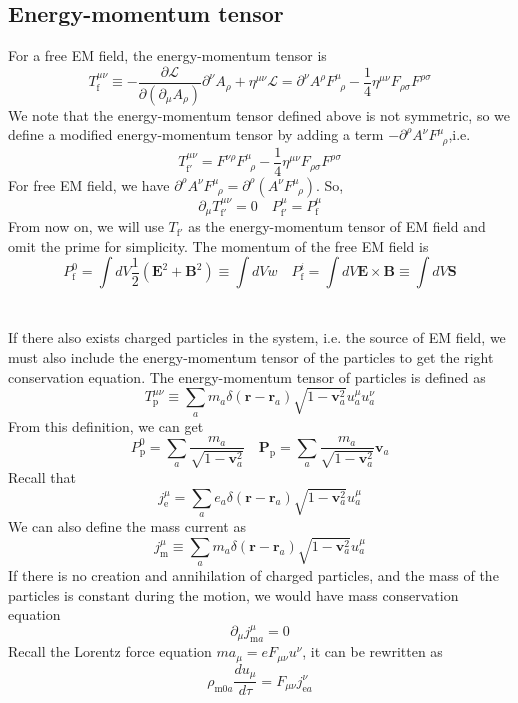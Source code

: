 \subsection{Energy-momentum tensor}
For a free EM field, the energy-momentum tensor is
\[T_{\mathrm{f}}^{\mu \nu} \equiv -\frac{\partial \mathcal{L}}{\partial(\partial_{\mu}A_{\rho})} \partial^{\nu} A_{\rho} + \eta^{\mu \nu} \mathcal{L} = \partial^{\nu}A^{\rho} F^{\mu}_{\phantom{\rho}\rho}-\frac{1}{4}\eta^{\mu\nu}F_{\rho\sigma}F^{\rho\sigma}\]
We note that the energy-momentum tensor defined above is not symmetric, so we define a modified energy-momentum tensor by adding a term $-\partial^{\rho}A^{\nu}F^{\mu}_{\phantom{\rho}\rho}$,i.e.
\[T_{\mathrm{f}'}^{\mu\nu} = F^{\nu\rho}F^{\mu}_{\phantom{\rho}\rho}-\frac{1}{4}\eta^{\mu\nu}F_{\rho\sigma}F^{\rho\sigma}\]
For free EM field, we have $\partial^{\rho}A^{\nu}F^{\mu}_{\phantom{\rho}\rho} = \partial^{\rho}\left(A^{\nu} F^{\mu}_{\phantom{\rho}\rho}\right)$.
So,
\[\partial_{\mu}T_{\mathrm{f}'}^{\mu\nu} = 0 \quad P_{\mathrm{f}'}^{\mu} = P_{\mathrm{f}}^{\mu}\]
From now on, we will use $T_{\mathrm{f}'}$ as the energy-momentum tensor of EM field and omit the prime for simplicity.
The momentum of the free EM field is
\[P_{\mathrm{f}}^{0} = \int dV \frac{1}{2}(\bm{E}^2+\bm{B}^2) \equiv \int dV w \quad P_{\mathrm{f}}^{i} = \int dV \bm{E} \times \bm{B} \equiv \int dV \bm{S}\]
\\ \\
If there also exists charged particles in the system, i.e. the source of EM field, we must also include the energy-momentum tensor of the particles to get the right conservation equation. The energy-momentum tensor of particles is defined as
\[T_{\mathrm{p}}^{\mu\nu} \equiv \sum_a m_a \delta(\bm{r}-\bm{r}_a) \sqrt{1-\bm{v}_a^2} u_a^\mu u_a^{\nu}\]
From this definition, we can get
\[P_{\mathrm{p}}^0 = \sum_a \frac{m_a}{\sqrt{1-\bm{v}_a^2}} \quad \bm{P}_{\mathrm{p}} =  \sum_a \frac{m_a}{\sqrt{1-\bm{v}_a^2}} \bm{v}_a\]
Recall that
\[j^{\mu}_{\mathrm{e}} = \sum_a e_a \delta(\bm{r}-\bm{r}_a) \sqrt{1-\bm{v}_a^2} u_a^\mu \]
We can also define the mass current as
\[j^{\mu}_{\mathrm{m}} \equiv \sum_a m_a \delta(\bm{r}-\bm{r}_a) \sqrt{1-\bm{v}_a^2} u_a^\mu \]
If there is no creation and annihilation of charged particles, and the mass of the particles is constant during the motion, we would have mass conservation equation
\[\partial_{\mu} j^{\mu}_{\mathrm{m}a} = 0\]
Recall the Lorentz force equation $m a_{\mu} = eF_{\mu\nu}u^{\nu}$, it can be rewritten as
\[\rho_{\mathrm{m}0a} \frac{du_{\mu}}{d\tau} = F_{\mu\nu}j_{\mathrm{e}a}^{\nu}\]
